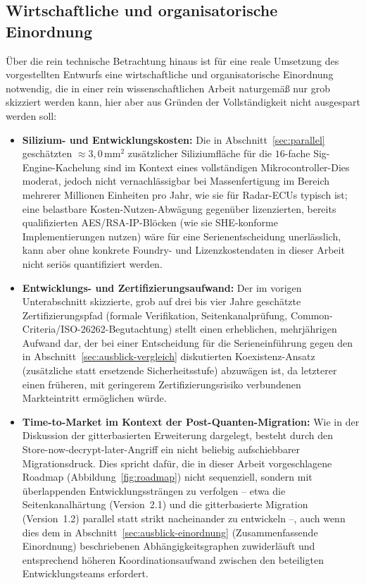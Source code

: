 ﻿\documentclass[a4paper,12pt]{article}
\theoremstyle{definition}
\begin{document}
\subsection{Wirtschaftliche und organisatorische Einordnung}

Über die rein technische Betrachtung hinaus ist für eine reale Umsetzung des vorgestellten Entwurfs eine wirtschaftliche und organisatorische Einordnung notwendig, die in einer rein wissenschaftlichen Arbeit naturgemäß nur grob skizziert werden kann, hier aber aus Gründen der Vollständigkeit nicht ausgespart werden soll:

\begin{itemize}
	\item \textbf{Silizium- und Entwicklungskosten:} Die in Abschnitt~\ref{sec:parallel} geschätzten $\approx 3{,}0\,\mathrm{mm}^2$ zusätzlicher Siliziumfläche für die $16$-fache Sig-Engine-Kachelung sind im Kontext eines vollständigen Mikrocontroller-Dies moderat, jedoch nicht vernachlässigbar bei Massenfertigung im Bereich mehrerer Millionen Einheiten pro Jahr, wie sie für Radar-ECUs typisch ist; eine belastbare Kosten-Nutzen-Abwägung gegenüber lizenzierten, bereits qualifizierten AES/RSA-IP-Blöcken (wie sie SHE-konforme Implementierungen nutzen) wäre für eine Serienentscheidung unerlässlich, kann aber ohne konkrete Foundry- und Lizenzkostendaten in dieser Arbeit nicht seriös quantifiziert werden.
	\item \textbf{Entwicklungs- und Zertifizierungsaufwand:} Der im vorigen Unterabschnitt skizzierte, grob auf drei bis vier Jahre geschätzte Zertifizierungspfad (formale Verifikation, Seitenkanalprüfung, Common-Criteria/ISO-26262-Begutachtung) stellt einen erheblichen, mehrjährigen Aufwand dar, der bei einer Entscheidung für die Serieneinführung gegen den in Abschnitt~\ref{sec:ausblick-vergleich} diskutierten Koexistenz-Ansatz (zusätzliche statt ersetzende Sicherheitsstufe) abzuwägen ist, da letzterer einen früheren, mit geringerem Zertifizierungsrisiko verbundenen Markteintritt ermöglichen würde.
	\item \textbf{Time-to-Market im Kontext der Post-Quanten-Migration:} Wie in der Diskussion der gitterbasierten Erweiterung dargelegt, besteht durch den Store-now-decrypt-later-Angriff ein nicht beliebig aufschiebbarer Migrationsdruck. Dies spricht dafür, die in dieser Arbeit vorgeschlagene Roadmap (Abbildung~\ref{fig:roadmap}) nicht sequenziell, sondern mit überlappenden Entwicklungssträngen zu verfolgen -- etwa die Seitenkanalhärtung (Version~2.1) und die gitterbasierte Migration (Version~1.2) parallel statt strikt nacheinander zu entwickeln --, auch wenn dies dem in Abschnitt~\ref{sec:ausblick-einordnung} (Zusammenfassende Einordnung) beschriebenen Abhängigkeitsgraphen zuwiderläuft und entsprechend höheren Koordinationsaufwand zwischen den beteiligten Entwicklungsteams erfordert.

\end{itemize}
\end{document}

